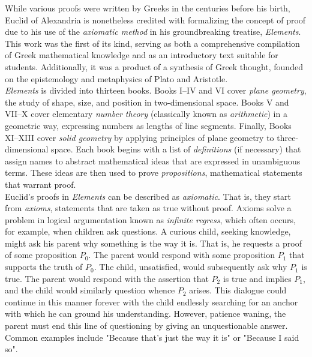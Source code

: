
While various proofs were written by Greeks in the centuries before his birth, Euclid of Alexandria is nonetheless credited with formalizing the concept of proof due to his use of the \textit{axiomatic method} in his groundbreaking treatise, \textit{Elements}. This work was the first of its kind, serving as both a comprehensive compilation of Greek mathematical knowledge and as an introductory text suitable for students. Additionally, it was a product of a synthesis of Greek thought, founded on the epistemology and metaphysics of Plato and Aristotle. \\

\textit{Elements} is divided into thirteen books. Books I--IV and VI cover \textit{plane geometry}, the study of shape, size, and position in two-dimensional space. Books V and VII--X cover elementary \textit{number theory} (classically known as \textit{arithmetic}) in a geometric way, expressing numbers as lengths of line segments. Finally, Books XI--XIII cover \textit{solid geometry} by applying principles of plane geometry to three-dimensional space. Each book begins with a list of \textit{definitions} (if necessary) that assign names to abstract mathematical ideas that are expressed in unambiguous terms. These ideas are then used to prove \textit{propositions}, mathematical statements that warrant proof. \\

Euclid's proofs in \textit{Elements} can be described as \textit{axiomatic}. That is, they start from \textit{axioms}, statements that are taken as true without proof. Axioms solve a problem in logical argumentation known as \textit{infinite regress}, which often occurs, for example, when children ask questions. A curious child, seeking knowledge, might ask his parent why something is the way it is. That is, he requests a proof of some proposition $P_0$. The parent would respond with some proposition $P_1$ that supports the truth of $P_0$. The child, unsatisfied, would subsequently ask why $P_1$ is true. The parent would respond with the assertion that $P_2$ is true and implies $P_1$, and the child would similarly question whence $P_2$ arises. This dialogue could continue in this manner forever with the child endlessly searching for an anchor with which he can ground his understanding. However, patience waning, the parent must end this line of questioning by giving an unquestionable answer. Common examples include "Because that's just the way it is" or "Because I said so". \\

